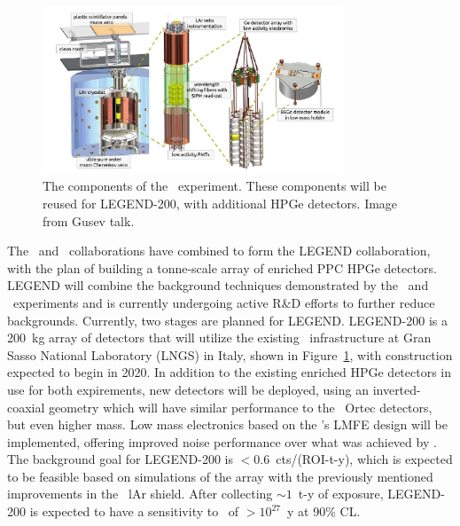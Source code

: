 \documentclass[/main.tex]{subfiles}
\begin{document}
\begin{figure}
  \centering
  \includegraphics[width=0.8\textwidth]{legend200}
  \caption[\Gerda\ experimental design]{\label{fig:legend200}
    The components of the \Gerda\ experiment. These components will be reused for LEGEND-200, with additional HPGe detectors. Image from Gusev talk.
  }
\end{figure}
The \MJ\ and \Gerda\ collaborations have combined to form the LEGEND collaboration, with the plan of building a tonne-scale array of enriched PPC HPGe detectors\cite{legend}.
LEGEND will combine the background techniques demonstrated by the \MJD\ and \Gerda\ experiments and is currently undergoing active R\&D efforts to further reduce backgrounds.
Currently, two stages are planned for LEGEND.
LEGEND-200 is a 200~kg array of detectors that will utilize the existing \Gerda\ infrastructure at Gran Sasso National Laboratory (LNGS) in Italy, shown in Figure~\ref{fig:legend200}, with construction expected to begin in 2020.
In addition to the existing enriched HPGe detectors in use for both expirements, new detectors will be deployed, using an inverted-coaxial geometry which will have similar performance to the \MJD\ Ortec detectors, but even higher mass.
Low mass electronics based on the \MJD 's LMFE design will be implemented, offering improved noise performance over what was achieved by \Gerda.
The background goal for LEGEND-200 is $<0.6$~cts/(ROI-t-y), which is expected to be feasible based on simulations of the array with the previously mentioned improvements in the \Gerda\ lAr shield.
After collecting ${\sim}1$~t-y of exposure, LEGEND-200 is expected to have a sensitivity to  \znbb\ of $>10^{27}$~y at 90\% CL.
\end{document}
